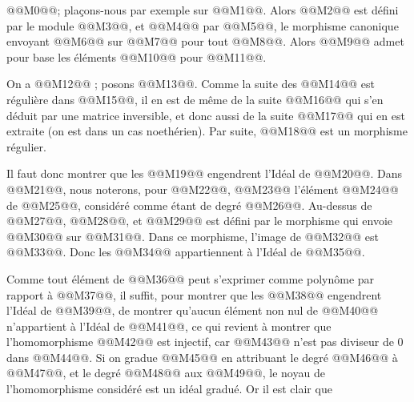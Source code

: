 
@@M0@@; plaçons-nous par exemple sur @@M1@@. Alors @@M2@@ est défini par le module @@M3@@, et @@M4@@ par @@M5@@, le morphisme canonique envoyant @@M6@@ sur @@M7@@ pour tout @@M8@@. Alors @@M9@@ admet pour base les éléments @@M10@@ pour @@M11@@.

On a @@M12@@ ; posons @@M13@@.
Comme la suite des @@M14@@ est régulière dans @@M15@@, il en est de même de la suite @@M16@@ qui s'en déduit par une matrice inversible, et donc aussi de la suite @@M17@@ qui en est extraite (on est dans un cas noethérien). Par suite, @@M18@@ est un morphisme régulier.

Il faut donc montrer que les @@M19@@ engendrent l'Idéal de @@M20@@. Dans @@M21@@, nous noterons, pour @@M22@@, @@M23@@ l'élément @@M24@@ de @@M25@@, considéré comme étant de degré @@M26@@. Au-dessus de @@M27@@, @@M28@@, et @@M29@@ est défini par le morphisme qui envoie @@M30@@ sur @@M31@@. Dans ce morphisme, l'image de @@M32@@ est @@M33@@. Donc les @@M34@@ appartiennent à l'Idéal de @@M35@@.

Comme tout élément de @@M36@@ peut s'exprimer comme polynôme par rapport à @@M37@@, il suffit, pour montrer que les @@M38@@ engendrent l'Idéal de @@M39@@, de montrer qu'aucun élément non nul de @@M40@@ n'appartient à l'Idéal de @@M41@@, ce qui revient à montrer que l'homomorphisme
@@M42@@
est injectif, car @@M43@@ n'est pas diviseur de 0 dans @@M44@@. Si on gradue @@M45@@ en attribuant le degré @@M46@@ à @@M47@@, et le degré @@M48@@ aux @@M49@@, le noyau de l'homomorphisme considéré est un idéal gradué. Or il est clair que

